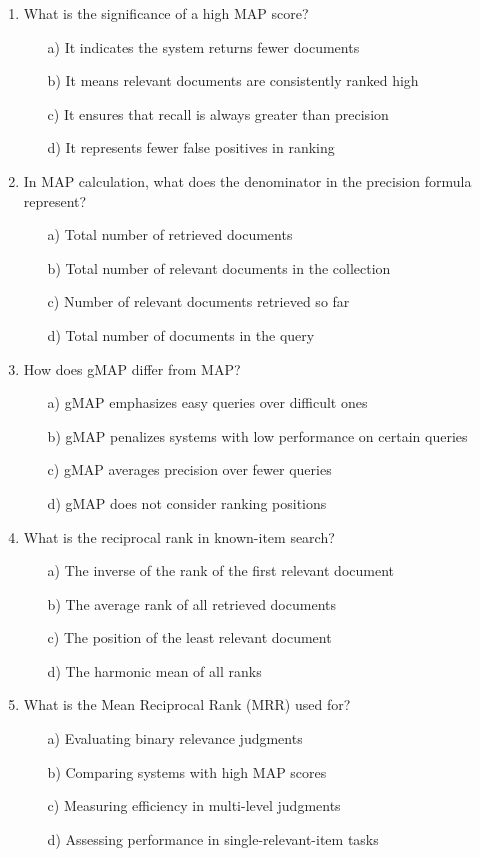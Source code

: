 \documentclass[8pt]{extarticle}
\begin{document}
\begin{multicols}{2}
\begin{enumerate}
\item What is the significance of a high MAP score?
\begin{itemize}
\item[a)] It indicates the system returns fewer documents
\item[b)] It means relevant documents are consistently ranked high
\item[c)] It ensures that recall is always greater than precision
\item[d)] It represents fewer false positives in ranking
\end{itemize}

\item In MAP calculation, what does the denominator in the precision formula represent?
\begin{itemize}
\item[a)] Total number of retrieved documents
\item[b)] Total number of relevant documents in the collection
\item[c)] Number of relevant documents retrieved so far
\item[d)] Total number of documents in the query
\end{itemize}

\item How does gMAP differ from MAP?
\begin{itemize}
\item[a)] gMAP emphasizes easy queries over difficult ones
\item[b)] gMAP penalizes systems with low performance on certain queries
\item[c)] gMAP averages precision over fewer queries
\item[d)] gMAP does not consider ranking positions
\end{itemize}

\item What is the reciprocal rank in known-item search?
\begin{itemize}
\item[a)] The inverse of the rank of the first relevant document
\item[b)] The average rank of all retrieved documents
\item[c)] The position of the least relevant document
\item[d)] The harmonic mean of all ranks
\end{itemize}

\item What is the Mean Reciprocal Rank (MRR) used for?
\begin{itemize}
\item[a)] Evaluating binary relevance judgments
\item[b)] Comparing systems with high MAP scores
\item[c)] Measuring efficiency in multi-level judgments
\item[d)] Assessing performance in single-relevant-item tasks
\end{itemize}


\end{enumerate}
\end{multicols}
\end{document}
